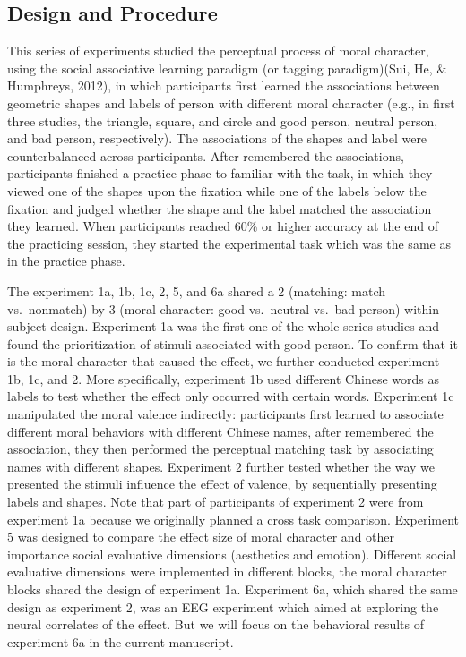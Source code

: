 \documentclass[
  english,
  man]{apa6}
\begin{document}
\hypertarget{design-and-procedure}{%
\subsection{Design and Procedure}\label{design-and-procedure}}

This series of experiments studied the perceptual process of moral character, using the social associative learning paradigm (or tagging paradigm)(Sui, He, \& Humphreys, 2012), in which participants first learned the associations between geometric shapes and labels of person with different moral character (e.g., in first three studies, the triangle, square, and circle and good person, neutral person, and bad person, respectively). The associations of the shapes and label were counterbalanced across participants. After remembered the associations, participants finished a practice phase to familiar with the task, in which they viewed one of the shapes upon the fixation while one of the labels below the fixation and judged whether the shape and the label matched the association they learned. When participants reached 60\% or higher accuracy at the end of the practicing session, they started the experimental task which was the same as in the practice phase.

The experiment 1a, 1b, 1c, 2, 5, and 6a shared a 2 (matching: match vs.~nonmatch) by 3 (moral character: good vs.~neutral vs.~bad person) within-subject design. Experiment 1a was the first one of the whole series studies and found the prioritization of stimuli associated with good-person. To confirm that it is the moral character that caused the effect, we further conducted experiment 1b, 1c, and 2. More specifically, experiment 1b used different Chinese words as labels to test whether the effect only occurred with certain words. Experiment 1c manipulated the moral valence indirectly: participants first learned to associate different moral behaviors with different Chinese names, after remembered the association, they then performed the perceptual matching task by associating names with different shapes. Experiment 2 further tested whether the way we presented the stimuli influence the effect of valence, by sequentially presenting labels and shapes. Note that part of participants of experiment 2 were from experiment 1a because we originally planned a cross task comparison. Experiment 5 was designed to compare the effect size of moral character and other importance social evaluative dimensions (aesthetics and emotion). Different social evaluative dimensions were implemented in different blocks, the moral character blocks shared the design of experiment 1a. Experiment 6a, which shared the same design as experiment 2, was an EEG experiment which aimed at exploring the neural correlates of the effect. But we will focus on the behavioral results of experiment 6a in the current manuscript.
\end{document}
